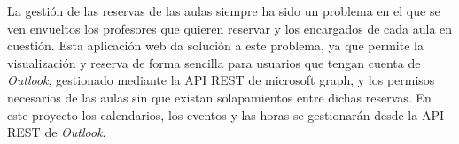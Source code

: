 
La gestión de las reservas de las aulas siempre ha sido un problema en el que se ven envueltos los profesores que quieren reservar y los encargados de cada aula en cuestión.
Esta aplicación web da solución a este problema, ya que permite la visualización y reserva de forma sencilla para usuarios que tengan cuenta de \textit{Outlook}, gestionado mediante la API REST de microsoft graph, y los permisos necesarios de las aulas sin que existan solapamientos entre dichas reservas. En este proyecto los calendarios, los eventos y las horas se gestionarán desde la API REST de \textit{Outlook}.